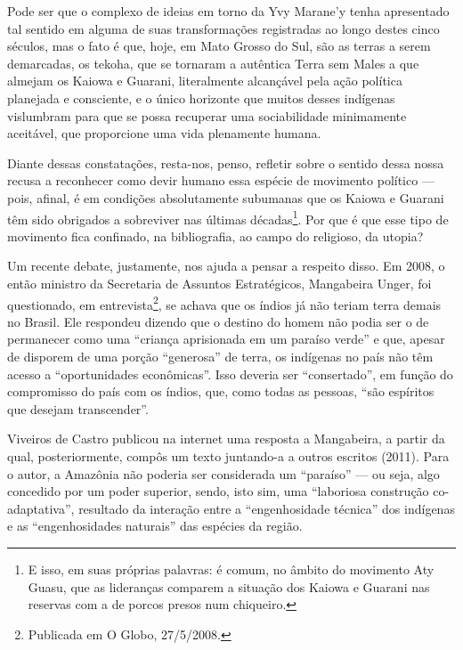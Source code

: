 \documentclass{article}
\begin{document}
Pode ser que o complexo de ideias em torno da Yvy
Marane{\textquoteright}y tenha apresentado tal sentido em alguma de
suas transforma\c{c}\~oes registradas ao longo destes cinco s\'eculos,
mas o fato \'e que, hoje, em Mato Grosso do Sul, s\~ao as terras a
serem demarcadas, os tekoha, que se tornaram a aut\^entica Terra sem
Males a que almejam os Kaiowa e Guarani, literalmente alcan\c{c}\'avel
pela a\c{c}\~ao pol\'itica planejada e consciente, e o \'unico
horizonte que muitos desses ind\'igenas vislumbram para que se possa
recuperar uma sociabilidade minimamente aceit\'avel, que proporcione
uma vida plenamente humana.

Diante dessas constata\c{c}\~oes, resta-nos, penso, refletir sobre o
sentido dessa nossa recusa a reconhecer como devir humano essa
esp\'ecie de movimento pol\'itico --- pois, afinal, \'e em
condi\c{c}\~oes absolutamente subumanas que os Kaiowa e Guarani t\^em
sido obrigados a sobreviver nas \'ultimas d\'ecadas\footnote{ E isso,
em suas pr\'oprias palavras: \'e comum, no \^ambito do movimento Aty
Guasu, que as lideran\c{c}as comparem a situa\c{c}\~ao dos Kaiowa e
Guarani nas reservas com a de porcos presos num chiqueiro.}. Por que
\'e que esse tipo de movimento fica confinado, na bibliografia, ao
campo do religioso, da utopia?

Um recente debate, justamente, nos ajuda a pensar a respeito disso. Em
2008, o ent\~ao ministro da Secretaria de Assuntos Estrat\'egicos,
Mangabeira Unger, foi questionado, em entrevista\footnote{ Publicada em
O Globo, 27/5/2008.}, se achava que os \'indios j\'a n\~ao teriam terra
demais no Brasil. Ele respondeu dizendo que o destino do homem n\~ao
podia ser o de permanecer como uma {\textquotedblleft}crian\c{c}a
aprisionada em um para\'iso verde{\textquotedblright} e que, apesar de
disporem de uma por\c{c}\~ao
{\textquotedblleft}generosa{\textquotedblright} de terra, os
ind\'igenas no pa\'is n\~ao t\^em acesso a
{\textquotedblleft}oportunidades econ\^omicas{\textquotedblright}. Isso
deveria ser {\textquotedblleft}consertado{\textquotedblright}, em
fun\c{c}\~ao do compromisso do pa\'is com os \'indios, que, como todas
as pessoas, {\textquotedblleft}s\~ao esp\'iritos que desejam
transcender{\textquotedblright}.

Viveiros de Castro publicou na internet uma resposta a Mangabeira, a
partir da qual, posteriormente, comp\^os um texto juntando-a a outros
escritos (2011). Para o autor, a Amaz\^onia n\~ao poderia ser
considerada um {\textquotedblleft}para\'iso{\textquotedblright} --- ou
seja, algo concedido por um poder superior, sendo, isto sim, uma
{\textquotedblleft}laboriosa constru\c{c}\~ao
co-adaptativa{\textquotedblright}, resultado da intera\c{c}\~ao entre a
{\textquotedblleft}engenhosidade t\'ecnica{\textquotedblright} dos
ind\'igenas e as {\textquotedblleft}engenhosidades
naturais{\textquotedblright}  das esp\'ecies da regi\~ao. 
\end{document}

